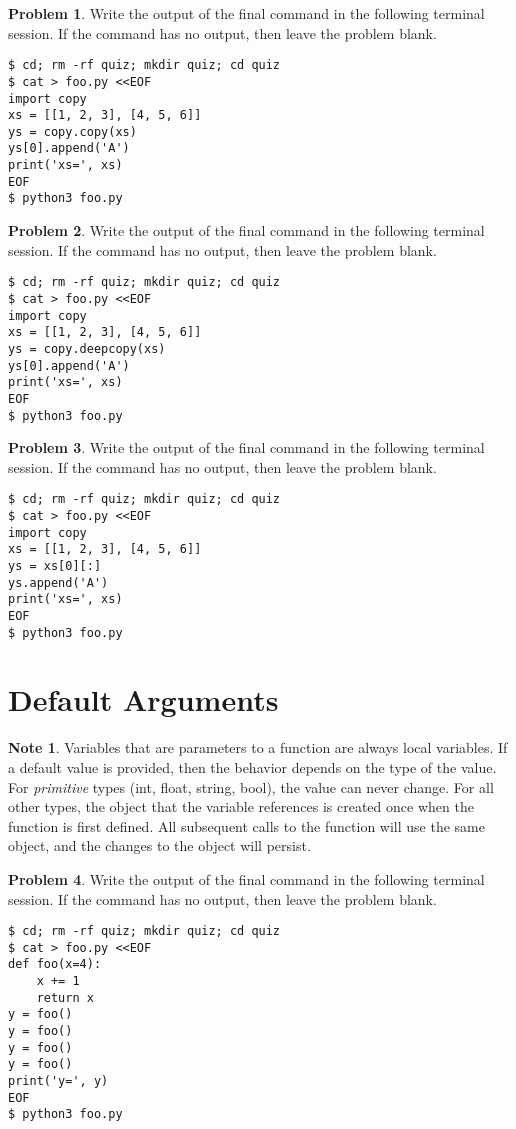 \documentclass[10pt]{article}
\theoremstyle{definition}
\newtheorem{problem}{Problem}
\newtheorem{note}{Note}
\begin{document}
\filbreak
\begin{problem}
    Write the output of the final command in the following terminal session.
    If the command has no output, then leave the problem blank.
\end{problem}
\begin{lstlisting}
$ cd; rm -rf quiz; mkdir quiz; cd quiz
$ cat > foo.py <<EOF
import copy
xs = [[1, 2, 3], [4, 5, 6]]
ys = copy.copy(xs)
ys[0].append('A')
print('xs=', xs)
EOF
$ python3 foo.py
\end{lstlisting}


\filbreak
\begin{problem}
    Write the output of the final command in the following terminal session.
    If the command has no output, then leave the problem blank.
\end{problem}
\begin{lstlisting}
$ cd; rm -rf quiz; mkdir quiz; cd quiz
$ cat > foo.py <<EOF
import copy
xs = [[1, 2, 3], [4, 5, 6]]
ys = copy.deepcopy(xs)
ys[0].append('A')
print('xs=', xs)
EOF
$ python3 foo.py
\end{lstlisting}

\filbreak
\begin{problem}
    Write the output of the final command in the following terminal session.
    If the command has no output, then leave the problem blank.
\end{problem}
\begin{lstlisting}
$ cd; rm -rf quiz; mkdir quiz; cd quiz
$ cat > foo.py <<EOF
import copy
xs = [[1, 2, 3], [4, 5, 6]]
ys = xs[0][:]
ys.append('A')
print('xs=', xs)
EOF
$ python3 foo.py
\end{lstlisting}

\section{Default Arguments}
\begin{note}
Variables that are parameters to a function are always local variables.
If a default value is provided, then the behavior depends on the type of the value.
For \emph{primitive} types (int, float, string, bool),
the value can never change.
For all other types, the object that the variable references is created once when the function is first defined.
All subsequent calls to the function will use the same object,
and the changes to the object will persist.
\end{note}

\filbreak
\begin{problem}
    Write the output of the final command in the following terminal session.
    If the command has no output, then leave the problem blank.
\end{problem}
\begin{lstlisting}
$ cd; rm -rf quiz; mkdir quiz; cd quiz
$ cat > foo.py <<EOF
def foo(x=4):
    x += 1
    return x
y = foo()
y = foo()
y = foo()
y = foo()
print('y=', y)
EOF
$ python3 foo.py
\end{lstlisting}
\end{document}
